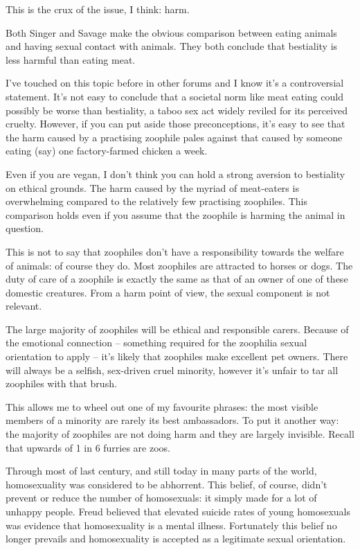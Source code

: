 This is the crux of the issue, I think: harm.

Both Singer and Savage make the obvious comparison between eating animals and having sexual contact with animals. They both conclude that bestiality is less harmful than eating meat.

I've touched on this topic before in other forums and I know it's a controversial statement. It's not easy to conclude that a societal norm like meat eating could possibly be worse than bestiality, a taboo sex act widely reviled for its perceived cruelty. However, if you can put aside those preconceptions, it's easy to see that the harm caused by a practising zoophile pales against that caused by someone eating (say) one factory-farmed chicken a week.

Even if you are vegan, I don't think you can hold a strong aversion to bestiality on ethical grounds. The harm caused by the myriad of meat-eaters is overwhelming compared to the relatively few practising zoophiles. This comparison holds even if you assume that the zoophile is harming the animal in question.

This is not to say that zoophiles don't have a responsibility towards the welfare of animals: of course they do. Most zoophiles are attracted to horses or dogs. The duty of care of a zoophile is exactly the same as that of an owner of one of these domestic creatures. From a harm point of view, the sexual component is not relevant.

The large majority of zoophiles will be ethical and responsible carers. Because of the emotional connection -- something required for the zoophilia sexual orientation to apply -- it's likely that zoophiles make excellent pet owners. There will always be a selfish, sex-driven cruel minority, however it's unfair to tar all zoophiles with that brush.

This allows me to wheel out one of my favourite phrases: the most visible members of a minority are rarely its best ambassadors. To put it another way: the majority of zoophiles are not doing harm and they are largely invisible. Recall that upwards of 1 in 6 furries are zoos.

Through most of last century, and still today in many parts of the world, homosexuality was considered to be abhorrent. This belief, of course, didn't prevent or reduce the number of homosexuals: it simply made for a lot of unhappy people. Freud believed that elevated suicide rates of young homosexuals was evidence that homosexuality is a mental illness. Fortunately this belief no longer prevails and homosexuality is accepted as a legitimate sexual orientation.

